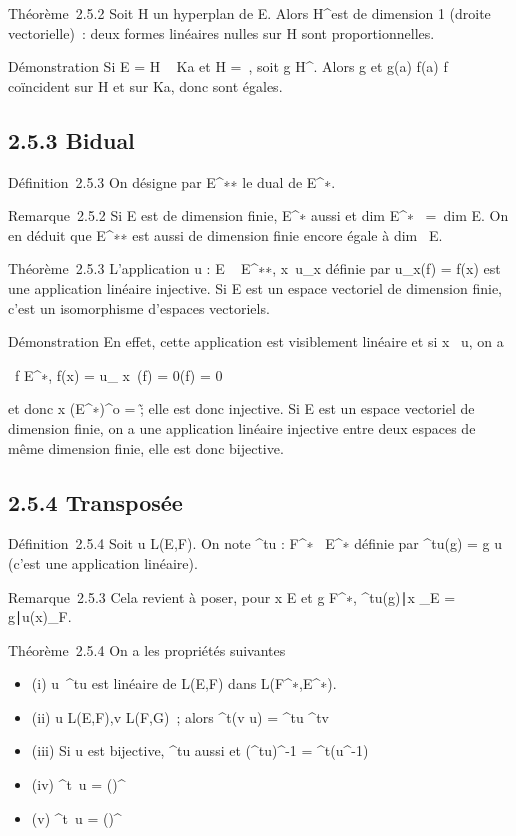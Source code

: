 \documentclass[]{article}
\begin{document}
Théorème~2.5.2 Soit H un hyperplan de E. Alors H^\bot est de
dimension 1 (droite vectorielle)~: deux formes linéaires nulles sur H
sont proportionnelles.

Démonstration Si E = H \oplus~ Ka et H =\
\mathrmKerf, soit g \in H^\bot. Alors g et 
g(a) \over f(a) f coïncident sur H et sur Ka, donc sont
égales.

\subsection{2.5.3 Bidual}

Définition~2.5.3 On désigne par E^∗∗ le dual de
E^∗.

Remarque~2.5.2 Si E est de dimension finie, E^∗ aussi et
dim E^∗~ =\
dim E. On en déduit que E^∗∗ est aussi de dimension finie
encore égale à dim~ E.

Théorème~2.5.3 L'application u : E \rightarrow~ E^∗∗,
x\mapsto~u_x définie par u_x(f) =
f(x) est une application linéaire injective. Si E est un espace
vectoriel de dimension finie, c'est un isomorphisme d'espaces
vectoriels.

Démonstration En effet, cette application est visiblement linéaire et si
x \in\mathrmKer~u, on a

\forall~f \in E^∗, f(x) = u_ x~(f) =
0(f) = 0

et donc x \in (E^∗)^o =
\0\~; elle est donc injective. Si E
est un espace vectoriel de dimension finie, on a une application
linéaire injective entre deux espaces de même dimension finie, elle est
donc bijective.

\subsection{2.5.4 Transposée}

Définition~2.5.4 Soit u \in L(E,F). On note ^tu :
F^∗\rightarrow~ E^∗ définie par ^tu(g) = g \cdot u
(c'est une application linéaire).

Remarque~2.5.3 Cela revient à poser, pour x \in E et g \in F^∗,
\langle
^tu(g)∣x\rangle
_E =\langle
g∣u(x)\rangle _F.

Théorème~2.5.4 On a les propriétés suivantes

\begin{itemize}
\itemsep1pt\parskip0pt
\item
  (i) u\mapsto~^tu est linéaire de L(E,F)
  dans L(F^∗,E^∗).
\item
  (ii) u \in L(E,F),v \in L(F,G)~; alors ^t(v \cdot u) =
  ^tu \cdot^tv
\item
  (iii) Si u est bijective, ^tu aussi et
  (^tu)^-1 = ^t(u^-1)
\item
  (iv)
  \mathrmKer^t~u
  =
  (\mathrmImu)^\bot~
\item
  (v)
  \mathrmIm^t~u =
  (\mathrmKeru)^\bot~
\end{itemize}
\end{document}
